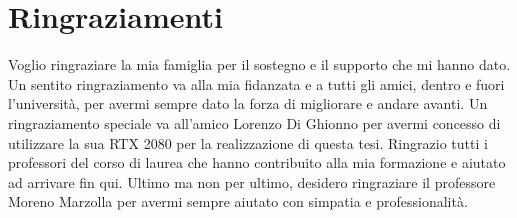 \documentclass[12pt,a4paper]{book}
\begin{document}
	\printbibliography
	
	\chapter*{Ringraziamenti}
	Voglio ringraziare la mia famiglia per il sostegno e il supporto che mi hanno dato. Un sentito ringraziamento va alla mia fidanzata e a tutti gli amici, dentro e fuori l'università, per avermi sempre dato la forza di migliorare e andare avanti. Un ringraziamento speciale va all'amico Lorenzo Di Ghionno per avermi concesso di utilizzare la sua RTX 2080 per la realizzazione di questa tesi. Ringrazio tutti i professori del corso di laurea che hanno contribuito alla mia formazione e aiutato ad arrivare fin qui. Ultimo ma non per ultimo, desidero ringraziare il professore Moreno Marzolla per avermi sempre aiutato con simpatia e professionalità.
	
\end{document}

